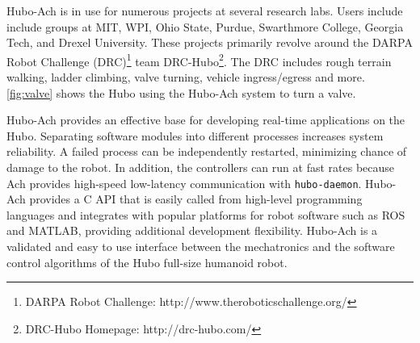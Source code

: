 Hubo-Ach is in use for numerous projects at several research labs.
Users include include groups at MIT, WPI, Ohio State, Purdue,
Swarthmore College, Georgia Tech, and Drexel University.  These
projects primarily revolve around the DARPA Robot Challenge
(DRC)\footnote{DARPA Robot Challenge:
  http://www.theroboticschallenge.org/} team
DRC-Hubo\footnote{DRC-Hubo Homepage: http://drc-hubo.com/}.  The DRC
includes rough terrain walking, ladder climbing, valve turning,
vehicle ingress/egress and more.  \autoref{fig:valve} shows the Hubo
using the Hubo-Ach system to turn a valve.


Hubo-Ach provides an effective base for developing real-time
applications on the Hubo.  Separating software modules into different
processes increases system reliability.  A failed process can be
independently restarted, minimizing chance of damage to the robot.  In
addition, the controllers can run at fast rates because Ach provides
high-speed low-latency communication with {\tt hubo-daemon}.  Hubo-Ach
provides a C API that is easily called from high-level programming
languages and integrates with popular platforms for robot software
such as ROS and MATLAB, providing additional development flexibility.
Hubo-Ach is a validated and easy to use interface between the
mechatronics and the software control algorithms of the Hubo full-size
humanoid robot.


